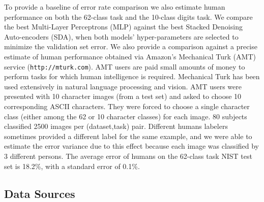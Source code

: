 \documentclass{article} %
\begin{document}
To provide a baseline of error rate comparison we also estimate human performance
on both the 62-class task and the 10-class digits task.
We compare the best Multi-Layer Perceptrons (MLP) against
the best Stacked Denoising Auto-encoders (SDA), when
both models' hyper-parameters are selected to minimize the validation set error.
We also provide a comparison against a precise estimate
of human performance obtained via Amazon's Mechanical Turk (AMT)
service ({\tt http://mturk.com}). 
AMT users are paid small amounts
of money to perform tasks for which human intelligence is required.
Mechanical Turk has been used extensively in natural language processing and vision.
AMT users were presented
with 10 character images (from a test set) and asked to choose 10 corresponding ASCII
characters. They were forced to choose a single character class (either among the
62 or 10 character classes) for each image.
80 subjects classified 2500 images per (dataset,task) pair.
Different humans labelers sometimes provided a different label for the same
example, and we were able to estimate the error variance due to this effect
because each image was classified by 3 different persons. 
The average error of humans on the 62-class task NIST test set
is 18.2\%, with a standard error of 0.1\%.

\vspace*{-3mm}
\subsection{Data Sources}
\vspace*{-2mm}
\end{document}
